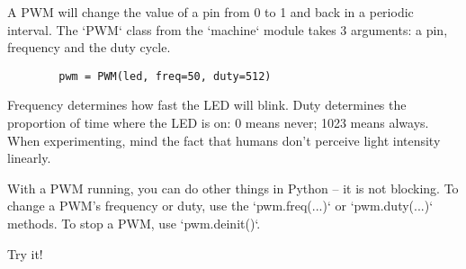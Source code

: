 \documentclass{../tutorial}
\begin{document}
\begin{enumerate}
    \begin{figure}[h]
        \centering
    \end{figure}

    A PWM will change the value of a pin from 0 to 1 and back in a periodic interval.
    The `PWM` class from the `machine` module takes 3 arguments:
    a pin, frequency and the duty cycle.

    \begin{lstlisting}
        pwm = PWM(led, freq=50, duty=512)
    \end{lstlisting}

    Frequency determines how fast the LED will blink.
    Duty determines the proportion of time where the LED is on: 0 means never;
    1023 means always.
    When experimenting, mind the fact that humans don't perceive light intensity linearly.

    With a PWM running, you can do other things in Python -- it is not blocking.
    To change a PWM's frequency or duty, use the `pwm.freq(...)`
    or `pwm.duty(...)` methods.
    To stop a PWM, use `pwm.deinit()`.

    Try it!

\end{enumerate}
\end{document}
